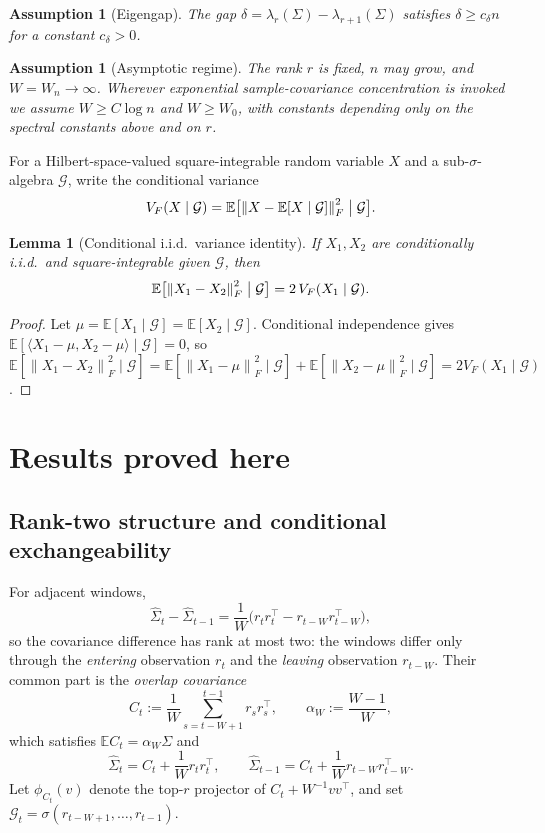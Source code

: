 \documentclass[11pt]{article}
\theoremstyle{tightplain}
\newtheorem{lemma}[theorem]{Lemma}
\theoremstyle{tightdef}
\newtheorem{assumption}[theorem]{Assumption}
\newcommand{\E}{\mathbb E}
\newcommand{\norm}[1]{\left\lVert #1 \right\rVert}
\newcommand{\Gcal}{\mathcal G}
\begin{document}
\begin{assumption}[Eigengap]\label{ass:gap}
The gap $\delta=\lambda_r(\Sigma)-\lambda_{r+1}(\Sigma)$ satisfies $\delta\ge c_\delta n$
for a constant $c_\delta>0$.
\end{assumption}

\begin{assumption}[Asymptotic regime]\label{ass:asymptotic}
The rank $r$ is fixed, $n$ may grow, and $W=W_n\to\infty$. Wherever exponential
sample-covariance concentration is invoked we assume $W\ge C\log n$ and $W\ge W_0$,
with constants depending only on the spectral constants above and on $r$.
\end{assumption}

For a Hilbert-space-valued square-integrable random variable $X$ and a
sub-$\sigma$-algebra $\Gcal$, write the conditional variance
\[
V_F(X\mid\Gcal)=\E\bigl[\norm{X-\E[X\mid\Gcal]}_F^2\bigm|\Gcal\bigr].
\]

\begin{lemma}[Conditional i.i.d.\ variance identity]\label{lem:iidvar}
If $X_1,X_2$ are conditionally i.i.d.\ and square-integrable given $\Gcal$, then
\[
\E\bigl[\norm{X_1-X_2}_F^2\bigm|\Gcal\bigr]=2\,V_F(X_1\mid\Gcal).
\]
\end{lemma}

\begin{proof}
Let $\mu=\E[X_1\mid\Gcal]=\E[X_2\mid\Gcal]$. Conditional independence gives
$\E[\langle X_1-\mu,X_2-\mu\rangle\mid\Gcal]=0$, so
$\E[\norm{X_1-X_2}_F^2\mid\Gcal]=\E[\norm{X_1-\mu}_F^2\mid\Gcal]
+\E[\norm{X_2-\mu}_F^2\mid\Gcal]=2V_F(X_1\mid\Gcal)$.
\end{proof}

\section{Results proved here}

\subsection{Rank-two structure and conditional exchangeability}\label{sec:exch}

For adjacent windows,
\[
\widehat\Sigma_t-\widehat\Sigma_{t-1}
=\frac1W\bigl(r_t r_t^\top-r_{t-W}r_{t-W}^\top\bigr),
\]
so the covariance difference has rank at most two: the windows differ only through
the \emph{entering} observation $r_t$ and the \emph{leaving} observation $r_{t-W}$.
Their common part is the \emph{overlap covariance}
\[
C_t:=\frac1W\sum_{s=t-W+1}^{t-1}r_s r_s^\top,
\qquad
\alpha_W:=\frac{W-1}{W},
\]
which satisfies $\E C_t=\alpha_W\Sigma$ and
\[
\widehat\Sigma_t=C_t+\frac1W r_t r_t^\top,
\qquad
\widehat\Sigma_{t-1}=C_t+\frac1W r_{t-W}r_{t-W}^\top.
\]
Let $\phi_{C_t}(v)$ denote the top-$r$ projector of $C_t+W^{-1}vv^\top$, and set
$\Gcal_t=\sigma(r_{t-W+1},\ldots,r_{t-1})$.
\end{document}
